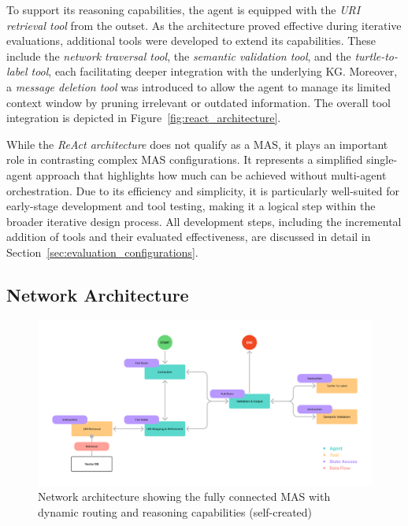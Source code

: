 \documentclass[a4paper,oneside,bibliography=totoc]{scrbook}
\begin{document}
To support its reasoning capabilities, the agent is equipped with the \textit{\ac{URI} retrieval tool} from the outset. As the architecture proved effective during iterative evaluations, additional tools were developed to extend its capabilities. These include the \textit{network traversal tool}, the \textit{semantic validation tool}, and the \textit{turtle-to-label tool}, each facilitating deeper integration with the underlying \ac{KG}. Moreover, a \textit{message deletion tool} was introduced to allow the agent to manage its limited context window by pruning irrelevant or outdated information. The overall tool integration is depicted in Figure~\ref{fig:react_architecture}.

While the \textit{ReAct architecture} does not qualify as a \ac{MAS}, it plays an important role in contrasting complex \ac{MAS} configurations. It represents a simplified single-agent approach that highlights how much can be achieved without multi-agent orchestration. Due to its efficiency and simplicity, it is particularly well-suited for early-stage development and tool testing, making it a logical step within the broader iterative design process. All development steps, including the incremental addition of tools and their evaluated effectiveness, are discussed in detail in Section~\ref{sec:evaluation_configurations}.

\subsection{Network Architecture}
\label{subsec:network}

\begin{figure}[tp]
  \centering
  \includegraphics[width=\textwidth]{figures/Network Architecture.png}
  \caption[Network architecture showing the fully connected \ac{MAS} with dynamic routing and reasoning capabilities]{Network architecture showing the fully connected \ac{MAS} with dynamic routing and reasoning capabilities (self-created)}
  \label{fig:network_architecture}
\end{figure}
\end{document}
